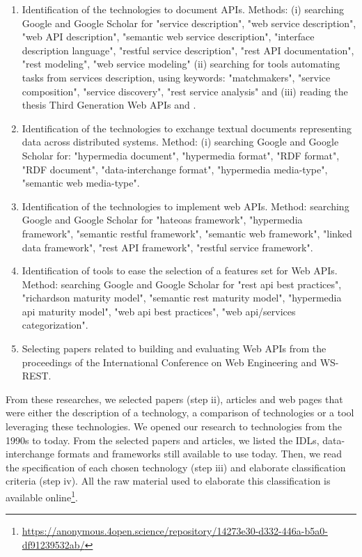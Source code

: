 \begin{enumerate}
    \item Identification of the technologies to document APIs. Methods: (i) searching Google and Google Scholar for "service description", "web service description", "web API description", "semantic web service description", "interface description language", "restful service description", "rest API documentation", "rest modeling", "web service modeling" (ii) searching for tools automating tasks from services description, using keywords: "matchmakers", "service composition", "service discovery", "rest service analysis" and (iii) reading the thesis Third Generation Web APIs \cite{lanthalerthird} and \cite{scherer2016description}.
    \item Identification of the technologies to exchange textual documents representing data across distributed systems. Method: (i) searching Google and Google Scholar for: "hypermedia document", "hypermedia format", "RDF format", "RDF document", "data-interchange format", "hypermedia media-type", "semantic web media-type".
    \item Identification of the technologies to implement web APIs. Method: searching Google and Google Scholar for "hateoas framework", "hypermedia framework", "semantic restful framework", "semantic web framework", "linked data framework", "rest API framework", "restful service framework".
    \item Identification of tools to ease the selection of a features set for Web APIs. Method: searching Google and Google Scholar for "rest api best practices", "richardson maturity model", "semantic rest maturity model", "hypermedia api maturity model", "web api best practices", "web api/services categorization".
    \item Selecting papers related to building and evaluating Web APIs from the proceedings of the International Conference on Web Engineering and WS-REST.
\end{enumerate}

From these researches, we selected papers (step ii), articles and web pages that were either the description of a technology, a comparison of technologies or a tool leveraging these technologies. We opened our research to technologies from the 1990s to today. 
From the selected papers and articles, we listed the IDLs, data-interchange formats and frameworks still available to use today.
Then, we read the specification of each chosen technology (step iii) and elaborate classification criteria (step iv). All the raw material used to elaborate this classification is available online\footnote{\url{https://anonymous.4open.science/repository/14273e30-d332-446a-b5a0-df91239532ab/}}. 

